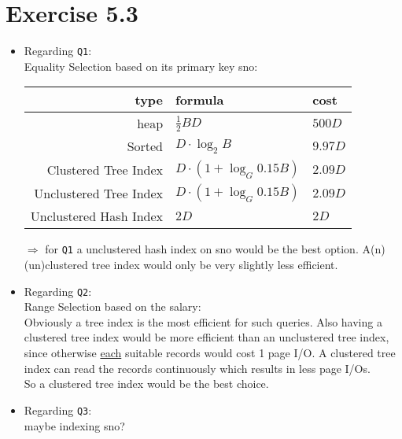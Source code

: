 \documentclass[12pt]{article}
\begin{document}
	\section*{Exercise 5.3}
		\begin{itemize}
			\item Regarding \texttt{Q1}: \\
				Equality Selection based on its primary key sno: \\
				\begin{tabular}{r | l | l}
					type & formula & cost \\ \hline
					heap & $\frac{1}{2}BD$ & $500D$ \\
					Sorted & $D\cdot \log_2 B$ & $9.97D$\\
					Clustered Tree Index & $D\cdot (1+ \log_G 0.15B)$ & $2.09D$ \\
					Unclustered Tree Index & $D\cdot (1+ \log_G 0.15B)$ & $2.09D$\\
					Unclustered Hash Index & $2D$ & $2D$ \\
				\end{tabular}
				$\Rightarrow$ for \texttt{Q1} a unclustered hash index on sno would be the best option. A(n) (un)clustered tree index would only be very slightly less efficient.
			\item Regarding \texttt{Q2}: \\
				Range Selection based on the salary:\\
				Obviously a tree index is the most efficient for such queries. Also having a clustered tree index would be more efficient than an unclustered tree index, since otherwise \underline{each} suitable records would cost 1 page I/O. A clustered tree index can read the records continuously which results in less page I/Os.\\
				So a clustered tree index would be the best choice. 
			\item Regarding \texttt{Q3}: \\
				maybe indexing sno? %
		\end{itemize}
\end{document}
